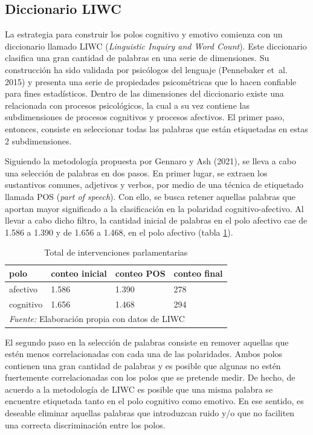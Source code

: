 \documentclass[
  12pt,
]{article}
\begin{document}
\hypertarget{diccionario-liwc}{%
\subsection{Diccionario LIWC}\label{diccionario-liwc}}

La estrategia para construir los polos cognitivo y emotivo comienza con
un diccionario llamado LIWC (\emph{Linguistic Inquiry and Word Count}).
Este diccionario clasifica una gran cantidad de palabras en una serie de
dimensiones. Su construcción ha sido validada por psicólogos del
lenguaje (Pennebaker et~al. 2015) y presenta una serie de propiedades
psicométricas que lo hacen confiable para fines estadísticos. Dentro de
las dimensiones del diccionario existe una relacionada con procesos
psicológicos, la cual a su vez contiene las subdimensiones de procesos
cognitivos y procesos afectivos. El primer paso, entonces, consiste en
seleccionar todas las palabras que están etiquetadas en estas 2
subdimensiones.

Siguiendo la metodología propuesta por Gennaro y Ash (2021), se lleva a
cabo una selección de palabras en dos pasos. En primer lugar, se extraen
los sustantivos comunes, adjetivos y verbos, por medio de una técnica de
etiquetado llamada POS (\emph{part of speech}). Con ello, se busca
retener aquellas palabras que aportan mayor significado a la
clasificación en la polaridad cognitivo-afectivo. Al llevar a cabo dicho
filtro, la cantidad inicial de palabras en el polo afectivo cae de 1.586
a 1.390 y de 1.656 a 1.468, en el polo afectivo (tabla
\ref{tab:tabla_filtro_polos}).

\begin{table}[H]

\caption{\label{tab:tabla_filtro_polos}Total de intervenciones parlamentarias}
\centering
\begin{tabular}[t]{llll}
\toprule
polo & conteo inicial & conteo POS & conteo final\\
\midrule
afectivo & 1.586 & 1.390 & 278\\
cognitivo & 1.656 & 1.468 & 294\\
\bottomrule
\multicolumn{4}{l}{\rule{0pt}{1em}\textit{Fuente:} Elaboración propia con datos de LIWC}\\
\end{tabular}
\end{table}

El segundo paso en la selección de palabras consiste en remover aquellas
que estén menos correlacionadas con cada una de las polaridades. Ambos
polos contienen una gran cantidad de palabras y es posible que algunas
no estén fuertemente correlacionadas con los polos que se pretende
medir. De hecho, de acuerdo a la metodología de LIWC es posible que una
misma palabra se encuentre etiquetada tanto en el polo cognitivo como
emotivo. En ese sentido, es deseable eliminar aquellas palabras que
introduzcan ruido y/o que no faciliten una correcta discriminación entre
los polos.
\end{document}
